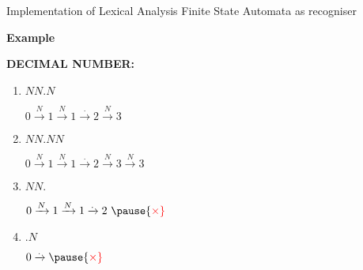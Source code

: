 \documentclass{beamer}
\newcommand{\myminorheader}[1]{
	{\color{BrickRed}
		\begin{Large}
			{\fontfamily{\sfdefault}\selectfont\textbf{#1}}
		\end{Large}
	}
}
\begin{document}
\begin{frame}{Implementation of Lexical Analysis}
{Finite State Automata as recogniser}

\myminorheader{Example}

\textbf{DECIMAL NUMBER:}
\begin{center}
\end{center}

\begin{enumerate}
\pause
\item $NN.N$ 
\begin{minipage}{0.5\linewidth}
\begin{flushright}
$0 \xrightarrow{N} 1 \xrightarrow{N} 1  \xrightarrow{.} 2 \xrightarrow{N} 3$ \pause {\color{Green}\checkmark}
\end{flushright}
\end{minipage}

\pause
\item $NN.NN$
\begin{minipage}{0.6\linewidth}
\begin{flushright}
$0 \xrightarrow{N} 1 \xrightarrow{N} 1  \xrightarrow{.} 2 \xrightarrow{N} 3 \xrightarrow{N} 3$ \pause {\color{Green}\checkmark}
\end{flushright}
\end{minipage}

\pause
\item $NN.$
\begin{minipage}{0.5\linewidth}
\begin{flushright}
$0 \xrightarrow{N} 1 \xrightarrow{N} 1  \xrightarrow{.} 2\ \pause {\color{Red}\times}$
\end{flushright}
\end{minipage}

\pause
\item $.N$
\begin{minipage}{0.5\linewidth}
\begin{flushright}
$0 \xrightarrow{.} \pause {\color{Red}\times}$
\end{flushright}
\end{minipage}


\end{enumerate}
\end{frame}
\end{document}
